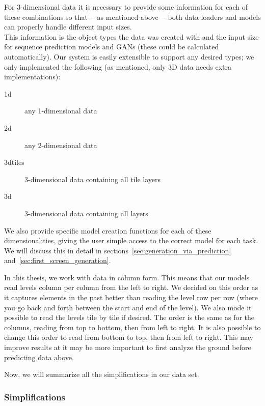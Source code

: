 For 3-dimensional data it is necessary to provide some information for
each of these combinations so that~-- as mentioned above~-- both data
loaders and models can properly handle different input sizes. \\
This information is the object types the data was created with and the
input size for sequence prediction models and GANs (these could be
calculated automatically). Our system is easily extensible to support
any desired types; we only implemented the following (as mentioned,
only 3D data needs extra implementations):
\begin{description}
\item[1d] any 1-dimensional data
\item[2d] any 2-dimensional data
\item[3dtiles] 3-dimensional data containing all tile layers
\item[3d] 3-dimensional data containing all layers
\end{description}
We also provide specific model creation functions for each of these
dimensionalities, giving the user simple access to the correct model
for each task. We will discuss this in detail in
sections~\ref{sec:generation_via_prediction}
and~\ref{sec:first_screen_generation}.

In this thesis, we work with data in column form. This means that our
models read levels column per column from the left to right. We
decided on this order as it captures elements in the past better than
reading the level row per row (where you go back and forth between the
start and end of the level). We also mode it possible to read the
levels tile by tile if desired. The order is the same as for the
columns, reading from top to bottom, then from left to right. It is
also possible to change this order to read from bottom to top, then
from left to right. This may improve results at it may be more
important to first analyze the ground before predicting data above.

Now, we will summarize all the simplifications in our data set.

\subsubsection{Simplifications}

